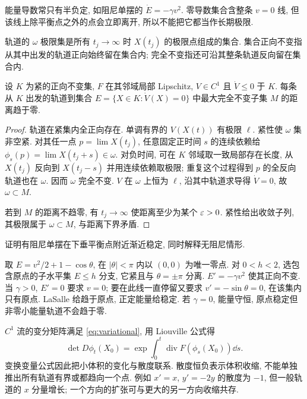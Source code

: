 能量导数常只有半负定, 如阻尼单摆的 $\dot E=-\gamma v^2$. 零导数集合含整条 $v=0$ 线, 但该线上除平衡点之外的点会立即离开, 所以不能把它都当作长期极限.
\begin{definition}
轨道的 $\omega$ 极限集是所有 $t_j\to\infty$ 时 $X(t_j)$ 的极限点组成的集合. 集合正向不变指从其中出发的轨道正向始终留在集合内; 完全不变指还可沿其整条轨道反向留在集合内.
\end{definition}
\begin{theorem}\label{thm:lasalle}
设 $K$ 为紧的正向不变集, $F$ 在其邻域局部 Lipschitz, $V\in C^1$ 且 $\dot V\le0$ 于 $K$. 每条从 $K$ 出发的轨道到集合 $E=\{X\in K:\dot V(X)=0\}$ 中最大完全不变子集 $M$ 的距离趋于零.
\end{theorem}
\begin{proof}
轨道在紧集内全正向存在. 单调有界的 $V(X(t))$ 有极限 $\ell$. 紧性使 $\omega$ 集非空紧. 对其任一点 $p=\lim X(t_j)$, 任意固定正时间 $s$ 的连续依赖给 $\phi_s(p)=\lim X(t_j+s)\in\omega$. 对负时间, 可在 $K$ 邻域取一致局部存在长度, 从 $X(t_j)$ 反向到 $X(t_j-s)$ 并用连续依赖取极限; 重复这个过程得到 $p$ 的全反向轨道也在 $\omega$. 因而 $\omega$ 完全不变. $V$ 在 $\omega$ 上恒为 $\ell$, 沿其中轨道求导得 $\dot V=0$, 故 $\omega\subset M$.

若到 $M$ 的距离不趋零, 有 $t_j\to\infty$ 使距离至少为某个 $\varepsilon>0$. 紧性给出收敛子列, 其极限属于 $\omega\subset M$, 与距离下界矛盾.
\end{proof}
\begin{example}证明有阻尼单摆在下垂平衡点附近渐近稳定, 同时解释无阻尼情形.\end{example}
\begin{solution}
取 $E=v^2/2+1-\cos\theta$, 在 $|\theta|<\pi$ 内以 $(0,0)$ 为唯一零点. 对 $0<h<2$, 选包含原点的子水平集 $E\le h$ 分支, 它紧且与 $\theta=\pm\pi$ 分离. $E'=-\gamma v^2$ 使其正向不变. 当 $\gamma>0$, $E'=0$ 要求 $v=0$; 要在此线一直停留又要求 $v'=-\sin\theta=0$, 在该集内只有原点. LaSalle 给趋于原点, 正定能量给稳定. 若 $\gamma=0$, 能量守恒, 原点稳定但非零小能量轨道不会趋于零.
\end{solution}
$C^1$ 流的变分矩阵满足 \eqref{eq:variational}, 用 Liouville 公式得
\[
\det D\phi_t(X_0)=\exp\int_0^t\operatorname{div}F(\phi_s(X_0))\dd s.
\]
变换变量公式因此把小体积的变化与散度联系. 散度恒负表示体积收缩, 不能单独推出所有轨道有界或都趋向一个点. 例如 $x'=x$, $y'=-2y$ 的散度为 $-1$, 但一般轨道的 $x$ 分量增长; 一个方向的扩张可与更大的另一方向收缩共存.

